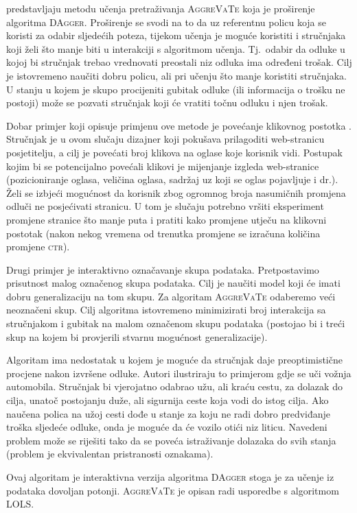 \citet{ross2011reduction} predstavljaju metodu učenja pretraživanja
\textsc{AggreVaTe}  koja je
proširenje algoritma \textsc{DAgger}. Proširenje se svodi na to da uz referentnu
policu koja se koristi za odabir sljedećih poteza, tijekom učenja je moguće
koristiti i stručnjaka koji želi što manje biti u interakciji s algoritmom
učenja. Tj.~odabir da odluke u kojoj bi stručnjak trebao vrednovati preostali
niz odluka ima određeni trošak. Cilj je istovremeno naučiti dobru policu, ali
pri učenju što manje koristiti stručnjaka. U stanju u kojem je skupo procijeniti
gubitak odluke (ili informacija o trošku ne postoji) može se pozvati stručnjak
koji će vratiti točnu odluku i njen trošak.

Dobar primjer koji opisuje primjenu ove metode je povećanje klikovnog postotka
. Stručnjak je u ovom slučaju dizajner koji
pokušava prilagoditi web-stranicu posjetitelju, a cilj je povećati broj klikova
na oglase koje korisnik vidi. Postupak kojim bi se potencijalno povećali klikovi
je mijenjanje izgleda web-stranice (pozicioniranje oglasa, veličina oglasa,
sadržaj uz koji se oglas pojavljuje i dr.). Želi se izbjeći mogućnost da
korisnik zbog ogromnog broja nasumičnih promjena odluči ne posjećivati stranicu.
U tom je slučaju potrebno vršiti eksperiment promjene stranice što manje puta i
pratiti kako promjene utječu na klikovni postotak (nakon nekog vremena od
trenutka promjene se izračuna količina promjene \textsc{ctr}).

Drugi primjer je interaktivno označavanje skupa podataka. Pretpostavimo
prisutnost malog označenog skupa podataka. Cilj je naučiti model koji će imati
dobru generalizaciju na tom skupu. Za algoritam \textsc{AggreVaTe} odaberemo
veći neoznačeni skup. Cilj algoritma istovremeno minimizirati broj interakcija
sa stručnjakom i gubitak na malom označenom skupu podataka (postojao bi i treći
skup na kojem bi provjerili stvarnu mogućnost generalizacije).

Algoritam ima nedostatak u kojem je moguće da stručnjak daje preoptimistične
procjene nakon izvršene odluke. Autori ilustriraju to primjerom gdje se uči
vožnja automobila. Stručnjak bi vjerojatno odabrao užu, ali kraću cestu, za
dolazak do cilja, unatoč postojanju duže, ali sigurnija ceste koja vodi do istog
cilja. Ako naučena polica na užoj cesti dođe u stanje za koju ne radi dobro
predviđanje troška sljedeće odluke, onda je moguće da će vozilo otići niz
liticu. Navedeni problem može se riješiti tako da se poveća istraživanje
dolazaka do svih stanja (problem je ekvivalentan pristranosti oznakama).

Ovaj algoritam je interaktivna verzija algoritma \textsc{DAgger} stoga je za
učenje iz podataka dovoljan potonji. \textsc{AggreVaTe} je opisan radi usporedbe
s algoritmom \textsc{LOLS}.
